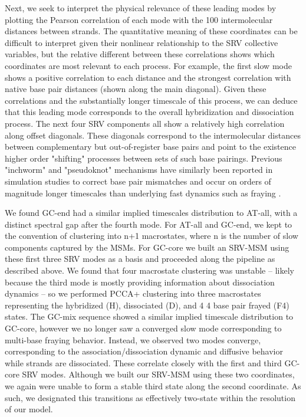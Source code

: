 \documentclass[journal=jpcbfk,manuscript=article]{achemso}
\begin{document}
Next, we seek to interpret the physical relevance of these leading modes by plotting the Pearson correlation of each mode with the 100 intermolecular distances between strands. The quantitative meaning of these coordinates can be difficult to interpret given their nonlinear relationship to the SRV collective variables, but the relative different between these correlations shows which coordinates are most relevant to each process. For example, the first slow mode shows a positive correlation to each distance and the strongest correlation with native base pair distances (shown along the main diagonal). Given these correlations and the substantially longer timescale of this process, we can deduce that this leading mode corresponds to the overall hybridization and dissociation process. The next four SRV components all show a relatively high correlation along offset diagonals. These diagonals correspond to the intermolecular distances between complementary but out-of-register base pairs and point to the existence higher order "shifting" processes between sets of such base pairings. Previous "inchworm" and "pseudoknot" mechanisms have similarly been reported in simulation studies to correct base pair mismatches and occur on orders of magnitude longer timescales than underlying fast dynamics such as fraying \citep{Romano2013DNADependence, Markegard2015, Maciejczyk2014DNAModel}.

We found GC-end had a similar implied timescales distribution to AT-all, with a distinct spectral gap after the fourth mode. For AT-all and GC-end, we kept to the convention of clustering into n+1 macrostates, where n is the number of slow components captured by the MSMs. For GC-core we built an SRV-MSM using these first three SRV modes as a basis and proceeded along the pipeline as described above. We found that four macrostate clustering was unstable -- likely because the third mode is mostly providing  information about dissociation dynamics -- so we performed PCCA+ clustering into three macrostates representing the hybridized (H), dissociated (D), and 4 4 base pair frayed (F4) states.  The GC-mix sequence showed a similar implied timescale distribution to GC-core, however we no longer saw a converged slow mode corresponding to multi-base fraying behavior. Instead, we observed two modes converge, corresponding to the association/dissociation dynamic and diffusive behavior while strands are dissociated. These correlate closely with the first and third GC-core SRV modes. Although we built our SRV-MSM using these two coordinates, we again were unable to form a stable third state along the second coordinate. As such, we designated this transitions as effectively two-state within the resolution of our model.
\end{document}
